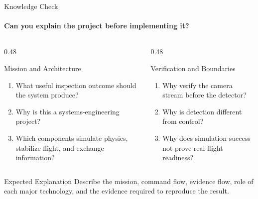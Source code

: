 \begin{frame}{Knowledge Check}
\framesubtitle{Can you explain the project before implementing it?}
\footnotesize
\begin{columns}[T,onlytextwidth]
    \begin{column}{0.48\textwidth}
        \begin{block}{Mission and Architecture}
            \begin{enumerate}
                \setlength{\itemsep}{0.2em}
                \item What useful inspection outcome should the system produce?
                \item Why is this a systems-engineering project?
                \item Which components simulate physics, stabilize flight, and exchange information?
            \end{enumerate}
        \end{block}
    \end{column}
    \begin{column}{0.48\textwidth}
        \begin{block}{Verification and Boundaries}
            \begin{enumerate}
                \setlength{\itemsep}{0.2em}
                \item Why verify the camera stream before the detector?
                \item Why is detection different from control?
                \item Why does simulation success not prove real-flight readiness?
            \end{enumerate}
        \end{block}
    \end{column}
\end{columns}
\begin{exampleblock}{Expected Explanation}
Describe the mission, command flow, evidence flow, role of each major technology, and the evidence required to reproduce the result.
\end{exampleblock}
\end{frame}

